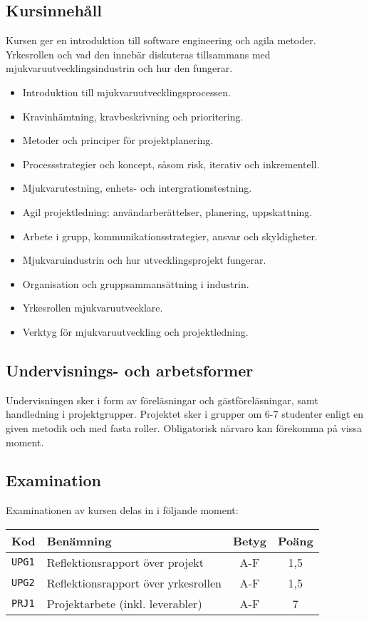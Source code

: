 \subsection*{Kursinnehåll}

Kursen ger en introduktion till software engineering och agila metoder.
Yrkesrollen och vad den innebär diskuteras tillsammans med
mjukvaruutvecklingsindustrin och hur den fungerar.

\begin{itemize}
\tightlist
\item
  Introduktion till mjukvaruutvecklingsprocessen.
\item
  Kravinhämtning, kravbeskrivning och prioritering.
\item
  Metoder och principer för projektplanering.
\item
  Processstrategier och koncept, såsom risk, iterativ och inkrementell.
\item
  Mjukvarutestning, enhets- och intergrationstestning.
\item
  Agil projektledning: användarberättelser, planering, uppskattning.
\item
  Arbete i grupp, kommunikationsstrategier, ansvar och skyldigheter.
\item
  Mjukvaruindustrin och hur utvecklingsprojekt fungerar.
\item
  Organisation och gruppsammansättning i industrin.
\item
  Yrkesrollen mjukvaruutvecklare.
\item
  Verktyg för mjukvaruutveckling och projektledning.
\end{itemize}

\subsection*{Undervisnings- och
arbetsformer}

Undervisningen sker i form av föreläsningar och gästföreläsningar, samt
handledning i projektgrupper. Projektet sker i grupper om 6-7 studenter
enligt en given metodik och med fasta roller. Obligatorisk närvaro kan
förekomma på vissa moment.

\subsection*{Examination}

Examinationen av kursen delas in i följande moment:

\begin{longtable}[]{@{}llcc@{}}
\toprule
\textsf{Kod} & \textsf{Benämning} & \textsf{Betyg} & \textsf{Poäng}\tabularnewline
\midrule
\endhead
\texttt{UPG1} & Reflektionsrapport över projekt & A-F & 1,5\tabularnewline
\texttt{UPG2} & Reflektionsrapport över yrkesrollen & A-F & 1,5\tabularnewline
\texttt{PRJ1} & Projektarbete (inkl. leverabler) & A-F & 7\tabularnewline
\bottomrule
\end{longtable}

